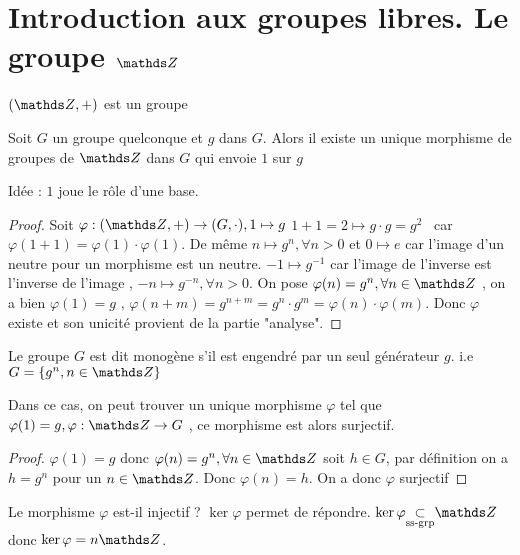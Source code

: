 \section{Introduction aux groupes libres. Le groupe $\Set{Z}$}
	$(\Set{Z} , +)$ est un groupe
	\begin{proposition}
		Soit $G$ un groupe quelconque et $g$ dans $G$. Alors il existe un unique morphisme de groupes de $\Set{Z}$ dans $G$ qui envoie $1$ sur $g$
	\end{proposition}
	Id\'{e}e : $1$ joue le r\^{o}le d'une base.
	\begin{proof}
		Soit $\varphi : (\Set{Z}, +) \rightarrow (G, \cdot) , 1 \mapsto g$ \newline
			$1+1 = 2 \mapsto g \cdot g = g^2$ \, car $\varphi(1+1) = \varphi(1) \cdot \varphi(1)$. \newline
		De m\^{e}me $n \mapsto g^n , \forall n > 0$ et $0 \mapsto e $ car l'image d'un neutre pour un morphisme est un neutre. \newline
		$-1 \mapsto g^{-1}$ car l'image de l'inverse est l'inverse de l'image , $-n \mapsto g^{-n}, \forall n > 0$.	\newline
		 On pose $\varphi(n) = g^n, \forall n \in \Set{Z}$ , on a bien $\varphi(1) = g$ , $\varphi(n+m) = g^{n+m} = g^n \cdot g^m 
		= \varphi(n) \cdot \varphi(m)$. \newline
		Donc $\varphi$ existe et son unicit\'{e} provient de la partie "analyse".
	\end{proof}
	\begin{definition}
		Le groupe $G$ est dit monog\`ene s'il est engendr\'e par un seul g\'en\'erateur $g$. \newline i.e $G = \{ g^n , n \in \Set{Z} \}$
	\end{definition}
	\begin{remark}
		Dans ce cas, on peut trouver un unique morphisme $\varphi$ tel que $\varphi(1) = g, \varphi : \Set{Z} \rightarrow G$ , ce morphisme est alors surjectif. 
	\end{remark}
	\begin{proof}
		$\varphi(1) = g$ donc $\varphi(n) = g^n , \forall n \in \Set{Z}$ soit $h \in G$, par d\'efinition on a $h = g^n$ pour un $n \in \Set{Z}$. \newline
		Donc $\varphi(n) = h$. 
		On a donc $\varphi$ surjectif
	\end{proof}
	Le morphisme $\varphi$ est-il injectif ? $\ker \varphi$ permet de r\'epondre. $\ker \varphi \sgr \Set{Z}$ donc $\ker \varphi = n\Set{Z}$.
